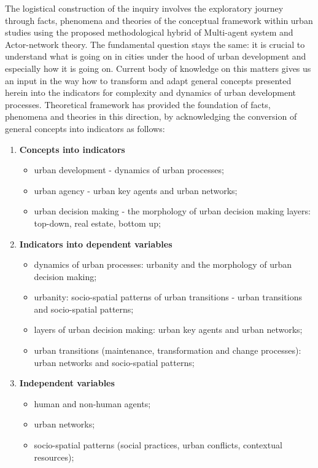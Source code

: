 \documentclass[11pt]{report}
\begin{document}
The logistical construction of the inquiry involves the exploratory journey through facts, phenomena and theories of the conceptual framework within urban studies using the proposed methodological hybrid of Multi-agent system and Actor-network theory. The fundamental question stays the same: it is crucial to understand what is going on in cities under the hood of urban development and especially how it is going on.
Current body of knowledge on this matters gives us an input in the way how to transform and adapt general concepts presented herein into the indicators for complexity and dynamics of urban development processes. Theoretical framework has provided the foundation of facts, phenomena and theories in this direction, by acknowledging the conversion of general concepts into indicators as follows:
\begin{enumerate}
\item \textbf{Concepts into indicators}
\begin{itemize}
\item urban development - dynamics of urban processes;
\item urban agency - urban key agents and urban networks;
\item urban decision making - the morphology of urban decision making layers: top-down, real estate, bottom up;
\end{itemize}
\item \textbf{Indicators into dependent variables}
\begin{itemize}
\item dynamics of urban processes: urbanity and the morphology of urban decision making;
\item urbanity: socio-spatial patterns of urban transitions - urban transitions and socio-spatial patterns;
\item layers of urban decision making: urban key agents and urban networks;
\item urban transitions (maintenance, transformation and change processes): urban networks and socio-spatial patterns;
\end{itemize}
\item \textbf{Independent variables}
\begin{itemize}
\item human and non-human agents;
\item urban networks;
\item socio-spatial patterns (social practices, urban conflicts, contextual resources);
\end{itemize}
\end{enumerate}
\end{document}
